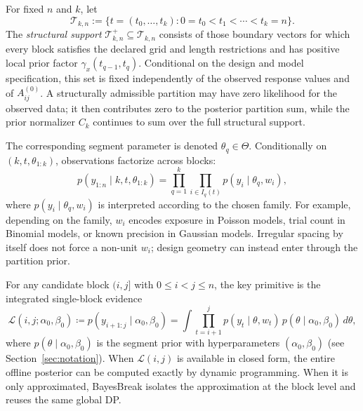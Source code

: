 \begin{definition}
\label{def:segmentation-space}
For fixed $n$ and $k$, let
\[
\mathcal{T}_{k,n}:=\{t=(t_0,\dots,t_k):0=t_0<t_1<\cdots<t_k=n\}.
\]
The \emph{structural support} $\mathcal{T}^{+}_{k,n}\subseteq\mathcal{T}_{k,n}$ consists of
those boundary vectors for which every block satisfies the declared grid and length restrictions
and has positive local prior factor $\gamma_x(t_{q-1},t_q)$. Conditional on the design and model
specification, this set is fixed independently of the observed response values and of
$A^{(0)}_{ij}$. A structurally admissible partition may have zero likelihood for the observed data;
it then contributes zero to the posterior partition sum, while the prior normalizer $C_k$ continues
to sum over the full structural support.
\end{definition}

The corresponding segment parameter is denoted $\theta_q\in\Theta$. Conditionally on
$(k,t,\theta_{1:k})$, observations factorize across blocks:
\begin{equation}
p(y_{1:n}\mid k,t,\theta_{1:k})
= \prod_{q=1}^k \prod_{i\in I_q(t)} p(y_i\mid \theta_q, w_i),
\label{eq:problem-lik}
\end{equation}
where $p(y_i\mid\theta_q,w_i)$ is interpreted according to the chosen family. For example,
depending on the family, $w_i$ encodes exposure in Poisson models, trial count in Binomial models, or known precision
in Gaussian models. Irregular spacing by itself does not force a non-unit $w_i$; design geometry
can instead enter through the partition prior.

For any candidate block $(i,j]$ with $0\le i<j\le n$, the key primitive is the integrated
single-block evidence
\begin{equation}
\mathcal{L}(i,j;\alpha_0,\beta_0)
\coloneqq p(y_{i+1:j}\mid \alpha_0,\beta_0)
= \int \prod_{t=i+1}^j p(y_t\mid\theta,w_t)\,p(\theta\mid\alpha_0,\beta_0)\,d\theta,
\label{eq:problem-block-evidence}
\end{equation}
where $p(\theta\mid\alpha_0,\beta_0)$ is the segment prior with hyperparameters $(\alpha_0,\beta_0)$
(see Section~\ref{sec:notation}). When $\mathcal{L}(i,j)$ is available in closed form, the
entire offline posterior can be computed exactly by dynamic programming. When it is only
approximated, BayesBreak isolates the approximation at the block level and reuses the same global
DP.

